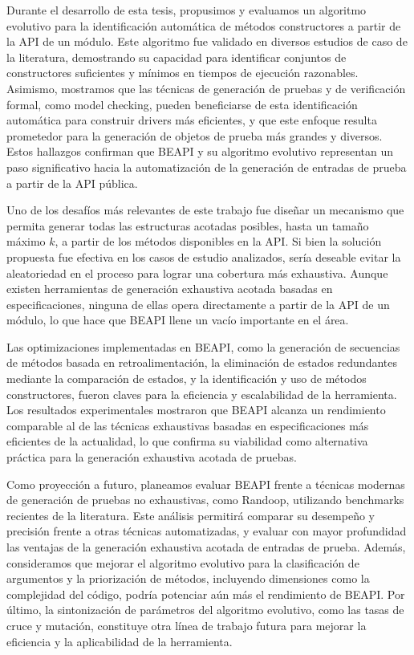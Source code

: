 Durante el desarrollo de esta tesis, propusimos y evaluamos un algoritmo evolutivo para la identificación automática de métodos constructores a partir de la API de un módulo. 
Este algoritmo fue validado en diversos estudios de caso de la literatura, demostrando su capacidad para identificar conjuntos de constructores suficientes y mínimos en tiempos de ejecución razonables. 
Asimismo, mostramos que las técnicas de generación de pruebas y de verificación formal, como model checking, pueden beneficiarse de esta identificación automática para construir drivers más eficientes, 
y que este enfoque resulta prometedor para la generación de objetos de prueba más grandes y diversos. 
Estos hallazgos confirman que BEAPI y su algoritmo evolutivo representan un paso significativo hacia la automatización de la generación de entradas de prueba a partir de la API pública.

Uno de los desafíos más relevantes de este trabajo fue diseñar un mecanismo que permita generar todas las estructuras acotadas posibles, 
hasta un tamaño máximo \( k \), a partir de los métodos disponibles en la API. Si bien la solución propuesta fue efectiva en los casos de estudio analizados, sería deseable evitar la aleatoriedad en el proceso para lograr una cobertura más exhaustiva. 
Aunque existen herramientas de generación exhaustiva acotada basadas en especificaciones, ninguna de ellas opera directamente a partir de la API de un módulo, lo que hace que BEAPI llene un vacío importante en el área.

Las optimizaciones implementadas en BEAPI, como la generación de secuencias de métodos basada en retroalimentación, la eliminación de estados redundantes mediante la comparación de estados, 
y la identificación y uso de métodos constructores, fueron claves para la eficiencia y escalabilidad de la herramienta. 
Los resultados experimentales mostraron que BEAPI alcanza un rendimiento comparable al de las técnicas exhaustivas basadas en especificaciones más eficientes de la actualidad, lo que confirma su viabilidad como alternativa práctica para la generación exhaustiva acotada de pruebas.

Como proyección a futuro, planeamos evaluar BEAPI frente a técnicas modernas de generación de pruebas no exhaustivas, como Randoop, utilizando benchmarks recientes de la literatura. 
Este análisis permitirá comparar su desempeño y precisión frente a otras técnicas automatizadas, 
y evaluar con mayor profundidad las ventajas de la generación exhaustiva acotada de entradas de prueba. 
Además, consideramos que mejorar el algoritmo evolutivo para la clasificación de argumentos y la priorización de métodos, 
incluyendo dimensiones como la complejidad del código, podría potenciar aún más el rendimiento de BEAPI. 
Por último, la sintonización de parámetros del algoritmo evolutivo, como las tasas de cruce y mutación, constituye otra línea de trabajo futura para mejorar la eficiencia y la aplicabilidad de la herramienta.

